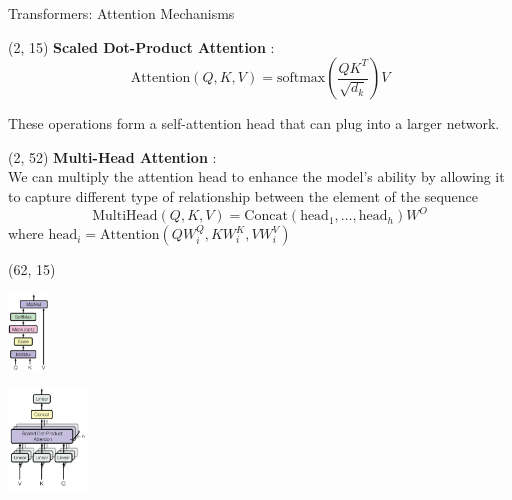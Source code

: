 \begin{frame}{Transformers: Attention Mechanisms}
  \begin{textblock}{60}(2, 15)
    \textbf{Scaled Dot-Product Attention} : \\  
    
    \[
    \text{Attention}(Q, K, V) = \text{softmax}\left(\frac{QK^T}{\sqrt{d_k}}\right)V
    \]

    These operations form a self-attention head that can plug into a larger network.\\ 
  \end{textblock}
  \begin{textblock}{60}(2, 52)
    \textbf{Multi-Head Attention} : \\
    We can multiply the attention head to enhance the model's ability by allowing it to capture different type of relationship between the element of the sequence
    \[
    \text{MultiHead}(Q, K, V) = \text{Concat}(\text{head}_1, \ldots, \text{head}_h)W^O
    \]
    where $\text{head}_i = \text{Attention}(QW_i^Q, KW_i^K, VW_i^V)$
  \end{textblock}

  \begin{textblock}{38}(62, 15)
    \begin{center}\includegraphics[width=40px]{img/transformer_10.png}\end{center}
    \begin{center}\includegraphics[width=80px]{img/transformer_11.png}\end{center}
  \end{textblock}

\end{frame}



